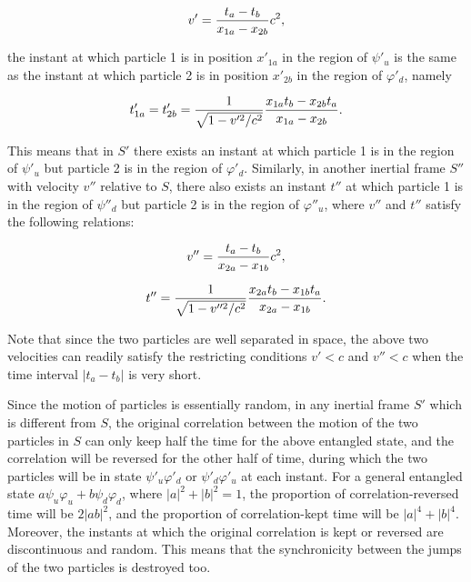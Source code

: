 \begin{equation}
v'={ {t_a-t_b} \over {x_{1a}-x_{2b}}}c^2,
\label{V'}
\end{equation}

\noindent the instant at which particle 1 is in position $x'_{1a}$ in the region of $\psi'_u$ is the same as the instant at which particle 2 is in position $x'_{2b}$ in the region of $\varphi'_d$, namely

\begin{equation}
t'_{1a}=t'_{2b}={1 \over \sqrt{1-v'^2/c^2}}  { {x_{1a}t_b-x_{2b}t_a} \over {x_{1a}-x_{2b}}}.
\label{}
\end{equation}

\noindent This means that in $S'$ there exists an instant at which particle 1 is in the region of $\psi'_u$ but particle 2 is in the region of $\varphi'_d$. Similarly, in another inertial frame $S''$ with velocity $v''$ relative to $S$, there also exists an instant $t''$ at which particle 1 is in the region of $\psi''_d$ but particle 2 is in the region of $\varphi''_u$, where $v''$ and $t''$ satisfy the following relations:

\begin{equation}
v''={ {t_a-t_b} \over {x_{2a}-x_{1b}}}c^2,
\label{V''}
\end{equation}

\begin{equation}
t''={1 \over \sqrt{1-v''^2/c^2}} { {x_{2a}t_b-x_{1b}t_a} \over {x_{2a}-x_{1b}}}.
\label{}
\end{equation}

\noindent Note that since the two particles are well separated in space, the above two velocities can readily satisfy the restricting conditions $v'<c$ and $v''<c$ when the time interval $|t_a-t_b|$ is very short. 

Since the motion of particles is essentially random, in any inertial frame $S'$ which is different from $S$, the original correlation between the motion of the two particles in $S$ can only keep half the time for the above entangled state, and the correlation will be reversed for the other half of time, during which the two particles will be in state $\psi'_u\varphi'_d$ or $\psi'_d\varphi'_u$ at each instant. For a general entangled state $a\psi_u\varphi_u+b\psi_d\varphi_d$, where $|a|^2+|b|^2=1$, the proportion of correlation-reversed time will be $2|ab|^2$, and the proportion of correlation-kept time will be $|a|^4 + |b|^4$. Moreover, the instants at which the original correlation is kept or reversed are discontinuous and random. This means that the synchronicity between the jumps of the two particles is destroyed too. 

